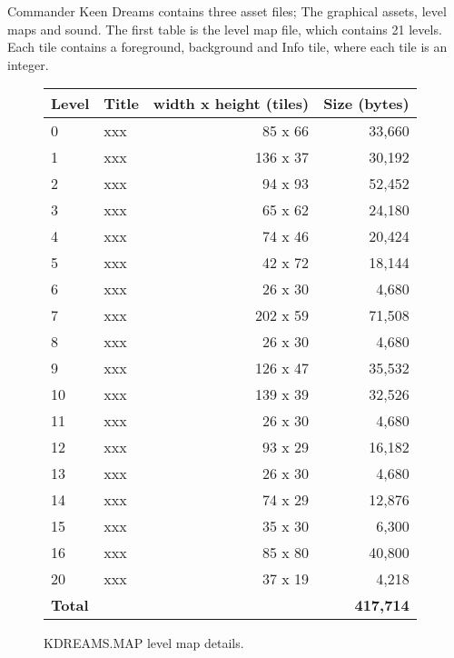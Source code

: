 \documentclass[book.tex]{subfiles}
\begin{document}
\label{asset_details}


Commander Keen Dreams contains three asset files; The graphical assets, level maps and sound. The first table is the level map file, which contains 21 levels. Each tile contains a foreground, background and Info tile, where each tile is an integer. 

\begin{figure}[H]
\centering
{\renewcommand{\arraystretch}{1.1} %
\begin{tabularx}{\textwidth}[c]{X X r r }
  \hline
  \textbf{Level} & \textbf{Title} & \textbf{width x height (tiles)} & \textbf{Size (bytes)}\\ \hline
	0 & xxx & 85 x 66 &  33,660 \\
	1 & xxx & 136 x 37 &   30,192 \\ 
	2 & xxx & 94 x 93 &   52,452 \\
	3 & xxx & 65 x 62 &  24,180 \\
	4 & xxx & 74 x 46 &  20,424 \\
	5 & xxx & 42 x 72 &   18,144 \\
	6 & xxx & 26 x 30 &   4,680 \\
	7 & xxx & 202 x 59 &  71,508 \\
	8 & xxx & 26 x 30 &  4,680 \\
	9 & xxx & 126 x 47 &  35,532 \\
	10 & xxx & 139 x 39 &  32,526 \\
	11 & xxx & 26 x 30 &  4,680 \\
	12 & xxx & 93 x 29 &  16,182 \\
	13 & xxx & 26 x 30 &  4,680 \\
	14 & xxx & 74 x 29 &  12,876 \\
	15 & xxx & 35 x 30 &  6,300 \\
	16 & xxx & 85 x 80 &  40,800 \\
	20 & xxx & 37 x 19 &  4,218 \\ \hline
	\textbf{Total} & \multicolumn{3}{r}{\textbf{417,714}} \\ \hline
\end{tabularx}
}
\caption{KDREAMS.MAP level map details.}
\end{figure}
\end{document}
